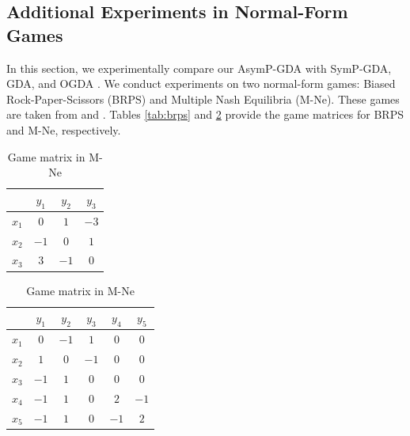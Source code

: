\documentclass{article}
\theoremstyle{plain}
\begin{document}
\subsection{Additional Experiments in Normal-Form Games}
\label{sec:appx_experiments_in_nfg}
In this section, we experimentally compare our AsymP-GDA with SymP-GDA, GDA, and OGDA \citep{daskalakis2017training,wei2020linear}.
We conduct experiments on two normal-form games: Biased Rock-Paper-Scissors (BRPS) and Multiple Nash Equilibria (M-Ne).
These games are taken from \citet{abe2022last} and \citet{wei2020linear}.
Tables \ref{tab:brps} and \ref{tab:m_ne} provide the game matrices for BRPS and M-Ne, respectively.
\begin{table}[h]
    \begin{minipage}[t]{.45\textwidth}
        \caption{Game matrix in BRPS}
        \begin{center}
            \begin{tabular}{cccc} \hline
                & $y_1$ & $y_2$ & $y_3$ \\ \hline
                $x_1$ & $0$   & $1$   & $-3$  \\
                $x_2$ & $-1$  & $0$   & $1$   \\
                $x_3$ & $3$   & $-1$  & $0$   \\ \hline
            \end{tabular}
        \end{center}
        \label{tab:brps}
    \end{minipage}
    \hfill
    \begin{minipage}[t]{.45\textwidth}
        \caption{Game matrix in M-Ne}
        \begin{center}
            \begin{tabular}{cccccc} \hline
                & $y_1$ & $y_2$ & $y_3$ & $y_4$ & $y_5$ \\ \hline
                $x_1$ & $0$   & $-1$  & $1$   & $0$   & $0$   \\
                $x_2$ & $1$   & $0$   & $-1$  & $0$   & $0$   \\
                $x_3$ & $-1$  & $1$   & $0$   & $0$   & $0$   \\
                $x_4$ & $-1$  & $1$   & $0$   & $2$   & $-1$  \\
                $x_5$ & $-1$  & $1$   & $0$   & $-1$  & $2$   \\ \hline
            \end{tabular}
        \end{center}
        \label{tab:m_ne}
    \end{minipage}
\end{table}
\end{document}
